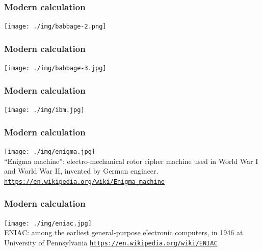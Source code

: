 \documentclass[11pt]{beamer}
\begin{document}
\begin{frame}[fragile]
  \frametitle{Modern calculation}

  \texttt{[image: ./img/babbage-2.png]}
\end{frame}

\begin{frame}[fragile]
  \frametitle{Modern calculation}

  \texttt{[image: ./img/babbage-3.jpg]}
\end{frame}

\begin{frame}[fragile]
  \frametitle{Modern calculation}

  \texttt{[image: ./img/ibm.jpg]}
  
  
\end{frame}

\fi

\begin{frame}[fragile]
  \frametitle{Modern calculation}

  \texttt{[image: ./img/enigma.jpg]}\\
   {\small ``Enigma machine'': electro-mechanical rotor cipher machine used in World War I and World War II, invented by German engineer.}
     \textcolor{\CSBase}{\small \texttt{\url{https://en.wikipedia.org/wiki/Enigma\_machine}}}
\end{frame}

\begin{frame}[fragile]
  \frametitle{Modern calculation}

  \texttt{[image: ./img/eniac.jpg]}\\
  {\small ENIAC: among the earliest general-purpose electronic computers, in 1946 at University of Pennsylvania}
   \textcolor{\CSBase}{\small \texttt{\url{https://en.wikipedia.org/wiki/ENIAC}}}
\end{frame}
\end{document}
